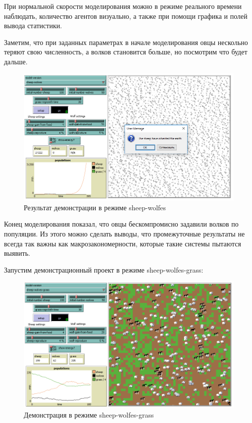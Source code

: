 \documentclass[14pt,a4paper,report]{report}
\begin{document}
При нормальной скорости моделирования можно в режиме реального времени наблюдать, количество агентов визуально, а также при помощи графика и полей вывода статистики. 

Заметим, что при заданных параметрах в начале моделирования овцы нескольно теряют свою численность, а волков становится больше, но посмотрим что будет дальше.

\clearpage

\begin{figure}[h!]
	\centering
	\includegraphics[scale = 0.68]{images/5.png}
	\caption{Результат демонстрации в режиме sheep-wolfes}
\end{figure}

Конец моделирования показал, что овцы бескомпромисно задавили волков по популяции. Из этого можно сделать выводы, что промежуточные результаты не всегда так важны как макрозакономерности, которые такие системы пытаются выявить.

Запустим демонстрационный проект в режиме sheep-wolfes-grass:

\begin{figure}[h!]
	\centering
	\includegraphics[scale = 0.68]{images/6.png}
	\caption{Демонстрация в режиме sheep-wolfes-grass}
\end{figure}
\end{document}
